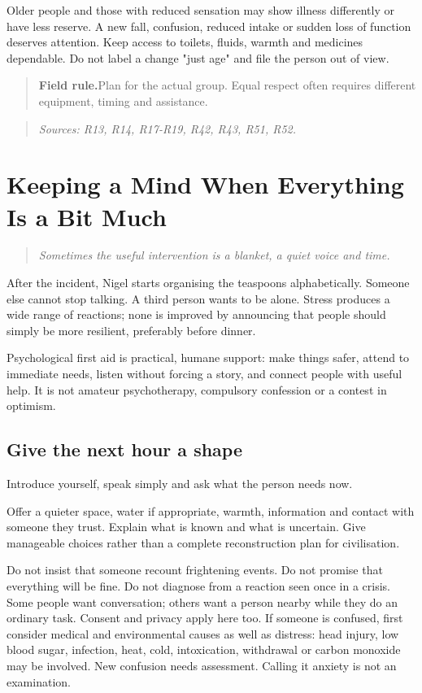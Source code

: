 \documentclass[10pt,openright]{book}
\newcommand{\fieldrule}[1]{\begin{quote}\textbf{Field rule.}\enspace #1\end{quote}}
\begin{document}
Older people and those with reduced sensation may show illness differently or have less reserve. A new fall, confusion, reduced intake or sudden loss of function deserves attention. Keep access to toilets, fluids, warmth and medicines dependable. Do not label a change "just age" and file the person out of view.

\fieldrule{Plan for the actual group. Equal respect often requires different equipment, timing and assistance.}
\begin{quote}\emph{Sources: R13, R14, R17-R19, R42, R43, R51, R52.}\end{quote}

\chapter{Keeping a Mind When Everything Is a Bit Much}
\begin{quote}\emph{Sometimes the useful intervention is a blanket, a quiet voice and time.}\end{quote}
After the incident, Nigel starts organising the teaspoons alphabetically. Someone else cannot stop talking. A third person wants to be alone. Stress produces a wide range of reactions; none is improved by announcing that people should simply be more resilient, preferably before dinner.

Psychological first aid is practical, humane support: make things safer, attend to immediate needs, listen without forcing a story, and connect people with useful help. It is not amateur psychotherapy, compulsory confession or a contest in optimism.

\section*{Give the next hour a shape}
Introduce yourself, speak simply and ask what the person needs now.

Offer a quieter space, water if appropriate, warmth, information and contact with someone they trust. Explain what is known and what is uncertain. Give manageable choices rather than a complete reconstruction plan for civilisation.

Do not insist that someone recount frightening events. Do not promise that everything will be fine. Do not diagnose from a reaction seen once in a crisis. Some people want conversation; others want a person nearby while they do an ordinary task. Consent and privacy apply here too. If someone is confused, first consider medical and environmental causes as well as distress: head injury, low blood sugar, infection, heat, cold, intoxication, withdrawal or carbon monoxide may be involved. New confusion needs assessment. Calling it anxiety is not an examination.
\end{document}
